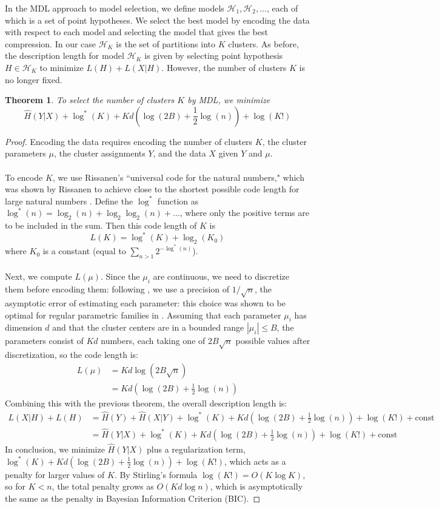 \documentclass{article} %
\newtheorem{theorem}{Theorem}
\begin{document}
In the MDL approach to model selection, we define models $\mathcal{H}_1,
\mathcal{H}_2, \dots$, each of which is a set of point hypotheses. We select
the best model by encoding the data with respect to each model and selecting
the model that gives the best compression. In our case $\mathcal{H}_K$ is the
set of partitions into $K$ clusters. As before, the description length for model $\mathcal{H}_K$ is given by selecting point hypothesis $H \in \mathcal{H}_K$ to minimize $L(H) + L(X|H)$. However, the number of clusters $K$ is no longer fixed.
\begin{theorem}
To select the number of clusters $K$ by MDL, we minimize
\[
\hat{H}(Y|X) + \log^*(K) + Kd(\log(2B) + \frac{1}{2} \log(n)) + \log(K!)
\]
\end{theorem}
\begin{proof}
Encoding the data requires encoding the number of clusters $K$, the cluster parameters $\mu$, the cluster assignments $Y$, and the data $X$ given $Y$ and $\mu$.\\\\
To encode $K$, we use Rissanen's ``universal code for the natural numbers," which was shown by Rissanen to achieve close to the shortest possible code length for large natural numbers \cite{rissanen1983universal}. Define the $\log^*$ function as $\log^*(n) = \log_2(n) + \log_2 \log_2 (n) + \dots$, where only the positive terms are to be included in the sum. Then this code length of $K$ is
\[ L(K) = \log^*(K) + \log_2(K_0) \]
where $K_0$ is a constant (equal to $\sum_{n>1} 2^{-\log^*(n)}$). \\\\
Next, we compute $L(\mu)$. Since the $\mu_i$ are continuous, we need to discretize them before encoding them: following \cite{rissanen1983universal}, we use a precision of $1/\sqrt{n}$, the asymptotic error of estimating each parameter: this choice was shown to be optimal for regular parametric families in \cite{rissanen1983universal}. Assuming that each parameter $\mu_i$ has dimension $d$ and that the cluster centers are in a bounded range $|\mu_i| \le B$, the parameters consist of $Kd$ numbers, each taking one of $2B\sqrt{n}$ possible values after discretization, so the code length is:
\begin{align*}
L(\mu) &= Kd \log(2B\sqrt{n}) \\
&= Kd(\log(2B) + \frac{1}{2} \log(n))
\end{align*}
Combining this with the previous theorem, the overall description length is:
\begin{align*}
L(X|H) + L(H) &= \hat{H}(Y) + \hat{H}(X|Y) +\log^*(K) + Kd(\log(2B) + \frac{1}{2} \log(n)) + \log(K!) +  \text{const}\\
&= \hat{H}(Y|X) + \log^*(K) + Kd(\log(2B) + \frac{1}{2} \log(n)) + \log(K!) + \text{const}
\end{align*}
In conclusion, we minimize $\hat{H}(Y|X)$ plus a regularization term, $\log^*(K) + Kd(\log(2B) + \frac{1}{2} \log(n)) + \log(K!)$, which acts as a penalty for larger values of $K$. By Stirling's formula $\log(K!) = O(K\log K)$, so for $K<n$, the total penalty grows as $O(Kd \log n)$, which is asymptotically the same as the penalty in Bayesian Information Criterion (BIC).
\end{proof}
\end{document}

